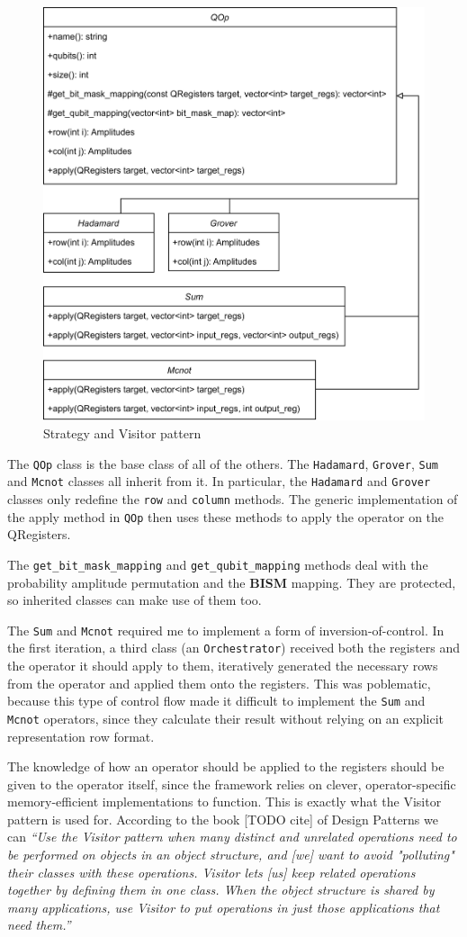 \begin{figure}[H]
    \centering
    \includegraphics[width=0.7\linewidth]{content/assets/04_simulator_implementation/uml.png}
    \caption{Strategy and Visitor pattern}
    \label{fig:my_label}
\end{figure}

The \texttt{QOp} class is the base class of all of the others. The \texttt{Hadamard}, \texttt{Grover}, \texttt{Sum} and \texttt{Mcnot} classes all inherit from it. In particular, the \texttt{Hadamard} and \texttt{Grover} classes only redefine the \texttt{row} and \texttt{column} methods. The generic implementation of the apply method in \texttt{QOp} then uses these methods to apply the operator on the QRegisters.

The \texttt{get\_bit\_mask\_mapping} and \texttt{get\_qubit\_mapping} methods deal with the probability amplitude permutation and the \textbf{BISM} mapping. They are protected, so inherited classes can make use of them too.

The \texttt{Sum} and \texttt{Mcnot} required me to implement a form of inversion-of-control. In the first iteration, a third class (an \texttt{Orchestrator}) received both the registers and the operator it should apply to them, iteratively generated the necessary rows from the operator and applied them onto the registers. This was poblematic, because this type of control flow made it difficult to implement the \texttt{Sum} and \texttt{Mcnot} operators, since they calculate their result without relying on an explicit representation row format.

The knowledge of how an operator should be applied to the registers should be given to the operator itself, since the framework relies on clever, operator-specific memory-efficient implementations to function. This is exactly what the Visitor pattern is used for. According to the book [TODO cite] of Design Patterns we can \textit{``Use the Visitor pattern when many distinct and unrelated operations need to be performed on objects in an object structure, and [we] want to avoid "polluting" their classes with these operations. Visitor lets [us] keep related operations together by defining them in one class. When the object structure is shared by many applications, use Visitor to put operations in just those applications that need them.''}
